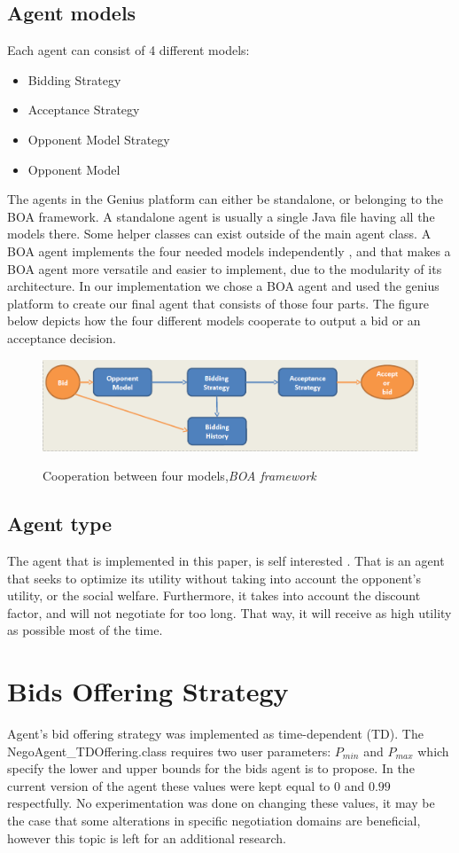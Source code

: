 \documentclass[html]{report}    %
\begin{document}
\subsection{Agent models}
Each agent can consist of 4 different models:
\begin{itemize}
  \item Bidding Strategy
  \item Acceptance Strategy
  \item Opponent Model Strategy
  \item Opponent Model   
\end{itemize}
The agents in the Genius platform can either be standalone, or belonging to the BOA framework. A standalone agent is usually a single Java file having all the models there. Some helper classes can exist outside of the main agent class. A BOA agent implements the four needed models independently , and that makes a BOA agent more versatile and easier to implement, due to the modularity of its architecture. In our implementation we chose a BOA agent and used the genius platform to create our final agent that consists of those four parts. The figure below depicts how the four different models cooperate to output a bid or an acceptance decision.
\begin{figure}[htbp]
	  \caption{Cooperation between four models,\newline \it{BOA framework}}
	  \centering
	    \includegraphics[width=1\textwidth]{fourmodels}
	  \label{ANAC BOA}
\end{figure}

\subsection{Agent type}
The agent that is implemented in this paper, is self interested . That is an agent that seeks to optimize its utility without taking into account the opponent's utility, or the social welfare. Furthermore, it takes into account the discount factor, and will not negotiate for too long. That way, it will receive as high utility as possible most of the time.

\section{Bids Offering Strategy}
Agent's bid offering strategy was implemented as time-dependent (TD). The NegoAgent\_TDOffering.class requires two user parameters: $P_{min}$ and $P_{max}$ which specify the lower and upper bounds for the bids agent is to propose. In the current version of the agent these values were kept equal to $0$ and $0.99$ respectfully. No experimentation was done on changing these values, it may be the case that some alterations in specific negotiation domains are beneficial, however this topic is left for an additional research.
\end{document}
